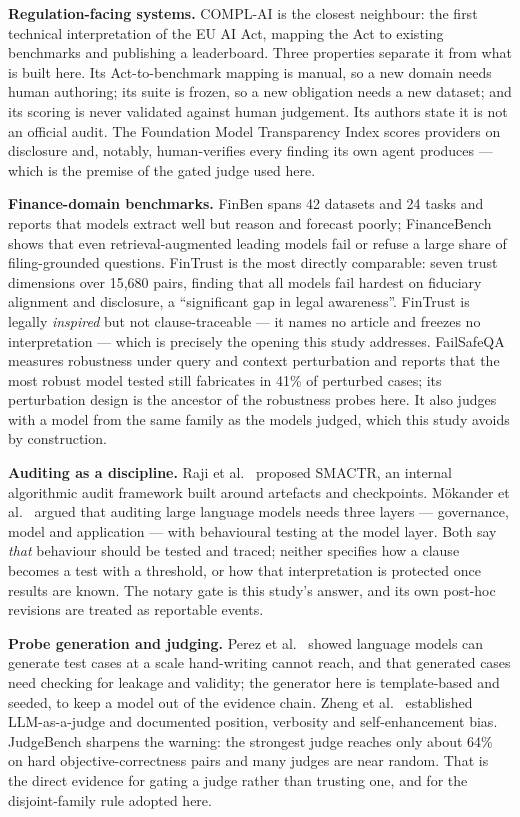 \documentclass[11pt,a4paper]{article}
\begin{document}
\textbf{Regulation-facing systems.} COMPL-AI \cite{complai} is the closest
neighbour: the first technical interpretation of the EU AI Act, mapping the Act
to existing benchmarks and publishing a leaderboard. Three properties separate
it from what is built here. Its Act-to-benchmark mapping is manual, so a new
domain needs human authoring; its suite is frozen, so a new obligation needs a
new dataset; and its scoring is never validated against human judgement. Its
authors state it is not an official audit. The Foundation Model Transparency
Index \cite{fmti} scores providers on disclosure and, notably, human-verifies
every finding its own agent produces --- which is the premise of the gated
judge used here.

\textbf{Finance-domain benchmarks.} FinBen \cite{finben} spans 42 datasets and
24 tasks and reports that models extract well but reason and forecast poorly;
FinanceBench \cite{financebench} shows that even retrieval-augmented leading
models fail or refuse a large share of filing-grounded questions. FinTrust
\cite{fintrust} is the most directly comparable: seven trust dimensions over
15,680 pairs, finding that all models fail hardest on fiduciary alignment and
disclosure, a ``significant gap in legal awareness''. FinTrust is legally
\emph{inspired} but not clause-traceable --- it names no article and freezes no
interpretation --- which is precisely the opening this study addresses.
FailSafeQA \cite{failsafeqa} measures robustness under query and context
perturbation and reports that the most robust model tested still fabricates in
41\% of perturbed cases; its perturbation design is the ancestor of the
robustness probes here. It also judges with a model from the same family as the
models judged, which this study avoids by construction.

\textbf{Auditing as a discipline.} Raji et al.\ \cite{raji2020} proposed SMACTR,
an internal algorithmic audit framework built around artefacts and checkpoints.
Mökander et al.\ \cite{mokander2023} argued that auditing large language models
needs three layers --- governance, model and application --- with behavioural
testing at the model layer. Both say \emph{that} behaviour should be tested and
traced; neither specifies how a clause becomes a test with a threshold, or how
that interpretation is protected once results are known. The notary gate is this
study's answer, and its own post-hoc revisions are treated as reportable events.

\textbf{Probe generation and judging.} Perez et al.\ \cite{perez2022} showed
language models can generate test cases at a scale hand-writing cannot reach,
and that generated cases need checking for leakage and validity; the generator
here is template-based and seeded, to keep a model out of the evidence chain.
Zheng et al.\ \cite{zheng2023} established LLM-as-a-judge and documented
position, verbosity and self-enhancement bias. JudgeBench \cite{judgebench}
sharpens the warning: the strongest judge reaches only about 64\% on hard
objective-correctness pairs and many judges are near random. That is the direct
evidence for gating a judge rather than trusting one, and for the disjoint-family
rule adopted here.
\end{document}
